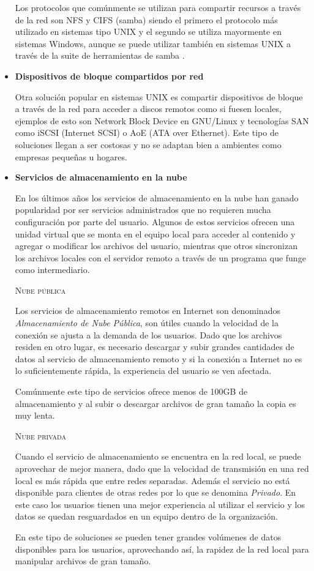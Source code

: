 \begin{itemize}
Los protocolos que com\'{u}nmente se utilizan para compartir recursos a trav\'{e}s de la red son NFS y CIFS (samba) siendo el primero el protocolo m\'{a}s utilizado en sistemas tipo UNIX y el segundo se utiliza mayormente en sistemas Windows, aunque se puede utilizar tambi\'{e}n en sistemas UNIX a trav\'{e}s de la suite de herramientas de samba \cite{_samba_????}.

      \item \textbf{Dispositivos de bloque compartidos por red}

Otra soluci\'{o}n popular en sistemas UNIX es compartir dispositivos de bloque a trav\'{e}s de la red para acceder a discos remotos como si fuesen locales, ejemplos de esto son Network Block Device en GNU/Linux y tecnolog\'{i}as SAN como iSCSI (Internet SCSI) o AoE (ATA over Ethernet). Este tipo de soluciones llegan a ser costosas y no se adaptan bien a ambientes como empresas peque\~{n}as u hogares.
    
      \item \textbf{Servicios de almacenamiento en la nube}

En los \'{u}ltimos a\~{n}os los servicios de almacenamiento en la nube han ganado popularidad por ser servicios administrados que no requieren mucha configuraci\'{o}n por parte del usuario. Algunos de estos servicios ofrecen una unidad virtual que se monta en el equipo local para acceder al contenido y agregar o modificar los archivos del usuario, mientras que otros sincronizan los archivos locales con el servidor remoto a trav\'{e}s de un programa que funge como intermediario.

        \textsc{Nube p\'{u}blica}

Los servicios de almacenamiento remotos en Internet son denominados \emph{Almacenamiento de Nube P\'{u}blica}, son \'{u}tiles cuando la velocidad de la conexi\'{o}n se ajusta a la demanda de los usuarios. Dado que los archivos residen en otro lugar, es necesario descargar y subir grandes cantidades de datos al servicio de almacenamiento remoto y si la conexi\'{o}n a Internet no es lo suficientemente r\'{a}pida, la experiencia del usuario se ven afectada.

Com\'{u}nmente este tipo de servicios ofrece menos de 100GB de almacenamiento y al subir o descargar archivos de gran tama\~{n}o la copia es muy lenta.

        \textsc{Nube privada}

Cuando el servicio de almacenamiento se encuentra en la red local, se puede aprovechar de mejor manera, dado que la velocidad de transmisi\'{o}n en una red local es m\'{a}s r\'{a}pida que entre redes separadas. Adem\'{a}s el servicio no est\'{a} disponible para clientes de otras redes por lo que se denomina \emph{Privado}. En este caso los usuarios tienen una mejor experiencia al utilizar el servicio y los datos se quedan resguardados en un equipo dentro de la organizaci\'{o}n.

En este tipo de soluciones se pueden tener grandes vol\'{u}menes de datos disponibles para los usuarios, aprovechando as\'{i}, la rapidez de la red local para manipular archivos de gran tama\~{n}o.

    \end{itemize}

